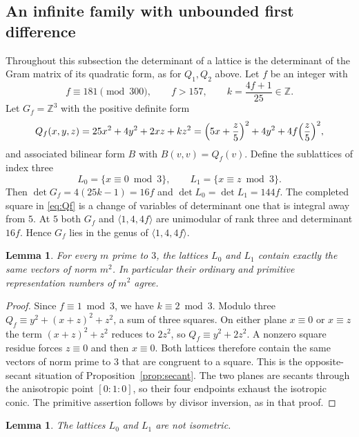 \documentclass[11pt,letterpaper]{amsart}
\newtheorem{lemma}[theorem]{Lemma}
\theoremstyle{definition}
\numberwithin{equation}{section}
\newcommand{\Z}{\mathbb Z}
\begin{document}
\subsection{An infinite family with unbounded first difference}
\label{sec:delay}

Throughout this subsection the determinant of a lattice is the
determinant of the Gram matrix of its quadratic form, as for \(Q_1,Q_2\)
above. Let \(f\) be an integer with
\[
 f\equiv181\pmod{300},\qquad f>157,\qquad k=\frac{4f+1}{25}\in\Z .
\]
Let \(G_f=\Z^3\) with the positive definite form
\begin{equation}\label{eq:Qf}
 Q_f(x,y,z)=25x^2+4y^2+2xz+kz^2
 =\Bigl(5x+\frac z5\Bigr)^2+4y^2+4f\Bigl(\frac z5\Bigr)^2 ,
\end{equation}
and associated bilinear form \(B\) with \(B(v,v)=Q_f(v)\). Define the
sublattices of index three
\[
 L_0=\{x\equiv0\bmod3\},\qquad L_1=\{x\equiv z\bmod3\}.
\]
Then \(\det G_f=4(25k-1)=16f\) and \(\det L_0=\det L_1=144f\). The
completed square in \eqref{eq:Qf} is a change of variables of
determinant one that is integral away from \(5\). At \(5\) both
\(G_f\) and \(\langle1,4,4f\rangle\) are unimodular of rank three and
determinant \(16f\). Hence \(G_f\) lies in the genus of
\(\langle1,4,4f\rangle\).

\begin{lemma}\label{lem:delay-secant}
For every \(m\) prime to \(3\), the lattices \(L_0\) and \(L_1\) contain
exactly the same vectors of norm \(m^2\). In particular their ordinary
and primitive representation numbers of \(m^2\) agree.
\end{lemma}

\begin{proof}
Since \(f\equiv1\bmod3\), we have \(k\equiv2\bmod3\). Modulo three
\(Q_f\equiv y^2+(x+z)^2+z^2\), a sum of three squares. On either plane
\(x\equiv0\) or \(x\equiv z\) the term \((x+z)^2+z^2\) reduces to
\(2z^2\), so \(Q_f\equiv y^2+2z^2\). A nonzero square residue forces
\(z\equiv0\) and then \(x\equiv0\). Both lattices therefore contain the
same vectors of norm prime to \(3\) that are congruent to a square. This
is the opposite-secant situation of Proposition~\ref{prop:secant}. The
two planes are secants through the anisotropic point \([0:1:0]\), so
their four endpoints exhaust the isotropic conic. The primitive
assertion follows by divisor inversion, as in that proof.
\end{proof}

\begin{lemma}\label{lem:delay-distinct}
The lattices \(L_0\) and \(L_1\) are not isometric.
\end{lemma}
\end{document}
